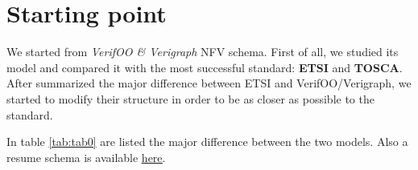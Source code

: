 \documentclass[11pt, english]{article}
\begin{document}
\section{Starting point}
We started from \textit{VerifOO \& Verigraph} NFV schema. First of all, we studied its model and compared it with the most successful standard: \textbf{ETSI} and \textbf{TOSCA}. After summarized the major difference between ETSI and VerifOO/Verigraph, we started to modify their structure in order to be as closer as possible to the standard.

In table \ref{tab:tab0} are listed the major difference between the two models. Also a resume schema is available \href{https://raw.githubusercontent.com/netgroup-polito/nfv-data-model/master/data-format/doc/VerifOO-Verigraph_resume.png?token=AYIltK1i1rPj3A9TCg0QdBJZRZjgzM3lks5ci86JwA\%3D\%3D}{\underline{here}}.
\end{document}
